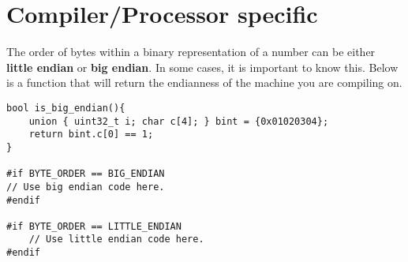 \section{Compiler/Processor specific}
The order of bytes within a binary representation of a number can be either \textbf{little endian} or \textbf{big endian}. In some cases, it is important to know this. Below is a function that will return the endianness of the machine you are compiling on.
\begin{lstlisting}
bool is_big_endian(){
	union { uint32_t i; char c[4]; } bint = {0x01020304};
	return bint.c[0] == 1;
}

#if BYTE_ORDER == BIG_ENDIAN
// Use big endian code here.
#endif

#if BYTE_ORDER == LITTLE_ENDIAN
	// Use little endian code here.
#endif
\end{lstlisting}





